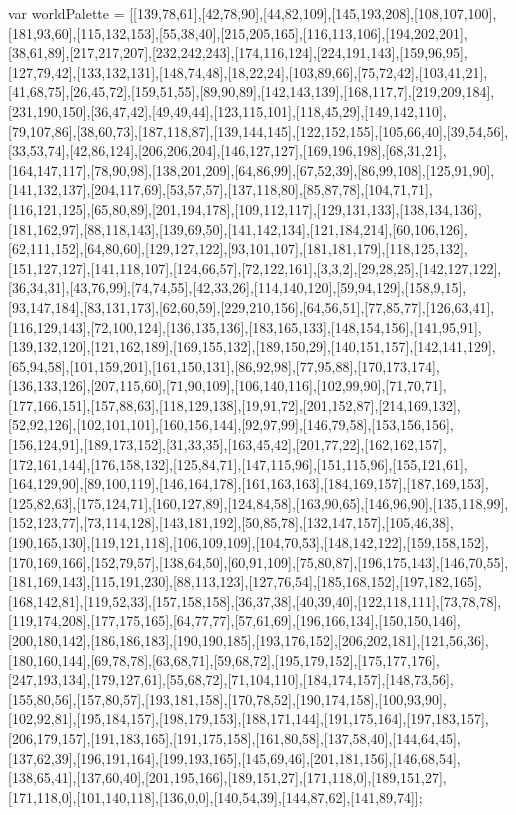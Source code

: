 var worldPalette = [[139,78,61],[42,78,90],[44,82,109],[145,193,208],[108,107,100],[181,93,60],[115,132,153],[55,38,40],[215,205,165],[116,113,106],[194,202,201],[38,61,89],[217,217,207],[232,242,243],[174,116,124],[224,191,143],[159,96,95],[127,79,42],[133,132,131],[148,74,48],[18,22,24],[103,89,66],[75,72,42],[103,41,21],[41,68,75],[26,45,72],[159,51,55],[89,90,89],[142,143,139],[168,117,7],[219,209,184],[231,190,150],[36,47,42],[49,49,44],[123,115,101],[118,45,29],[149,142,110],[79,107,86],[38,60,73],[187,118,87],[139,144,145],[122,152,155],[105,66,40],[39,54,56],[33,53,74],[42,86,124],[206,206,204],[146,127,127],[169,196,198],[68,31,21],[164,147,117],[78,90,98],[138,201,209],[64,86,99],[67,52,39],[86,99,108],[125,91,90],[141,132,137],[204,117,69],[53,57,57],[137,118,80],[85,87,78],[104,71,71],[116,121,125],[65,80,89],[201,194,178],[109,112,117],[129,131,133],[138,134,136],[181,162,97],[88,118,143],[139,69,50],[141,142,134],[121,184,214],[60,106,126],[62,111,152],[64,80,60],[129,127,122],[93,101,107],[181,181,179],[118,125,132],[151,127,127],[141,118,107],[124,66,57],[72,122,161],[3,3,2],[29,28,25],[142,127,122],[36,34,31],[43,76,99],[74,74,55],[42,33,26],[114,140,120],[59,94,129],[158,9,15],[93,147,184],[83,131,173],[62,60,59],[229,210,156],[64,56,51],[77,85,77],[126,63,41],[116,129,143],[72,100,124],[136,135,136],[183,165,133],[148,154,156],[141,95,91],[139,132,120],[121,162,189],[169,155,132],[189,150,29],[140,151,157],[142,141,129],[65,94,58],[101,159,201],[161,150,131],[86,92,98],[77,95,88],[170,173,174],[136,133,126],[207,115,60],[71,90,109],[106,140,116],[102,99,90],[71,70,71],[177,166,151],[157,88,63],[118,129,138],[19,91,72],[201,152,87],[214,169,132],[52,92,126],[102,101,101],[160,156,144],[92,97,99],[146,79,58],[153,156,156],[156,124,91],[189,173,152],[31,33,35],[163,45,42],[201,77,22],[162,162,157],[172,161,144],[176,158,132],[125,84,71],[147,115,96],[151,115,96],[155,121,61],[164,129,90],[89,100,119],[146,164,178],[161,163,163],[184,169,157],[187,169,153],[125,82,63],[175,124,71],[160,127,89],[124,84,58],[163,90,65],[146,96,90],[135,118,99],[152,123,77],[73,114,128],[143,181,192],[50,85,78],[132,147,157],[105,46,38],[190,165,130],[119,121,118],[106,109,109],[104,70,53],[148,142,122],[159,158,152],[170,169,166],[152,79,57],[138,64,50],[60,91,109],[75,80,87],[196,175,143],[146,70,55],[181,169,143],[115,191,230],[88,113,123],[127,76,54],[185,168,152],[197,182,165],[168,142,81],[119,52,33],[157,158,158],[36,37,38],[40,39,40],[122,118,111],[73,78,78],[119,174,208],[177,175,165],[64,77,77],[57,61,69],[196,166,134],[150,150,146],[200,180,142],[186,186,183],[190,190,185],[193,176,152],[206,202,181],[121,56,36],[180,160,144],[69,78,78],[63,68,71],[59,68,72],[195,179,152],[175,177,176],[247,193,134],[179,127,61],[55,68,72],[71,104,110],[184,174,157],[148,73,56],[155,80,56],[157,80,57],[193,181,158],[170,78,52],[190,174,158],[100,93,90],[102,92,81],[195,184,157],[198,179,153],[188,171,144],[191,175,164],[197,183,157],[206,179,157],[191,183,165],[191,175,158],[161,80,58],[137,58,40],[144,64,45],[137,62,39],[196,191,164],[199,193,165],[145,69,46],[201,181,156],[146,68,54],[138,65,41],[137,60,40],[201,195,166],[189,151,27],[171,118,0],[189,151,27],[171,118,0],[101,140,118],[136,0,0],[140,54,39],[144,87,62],[141,89,74]];

